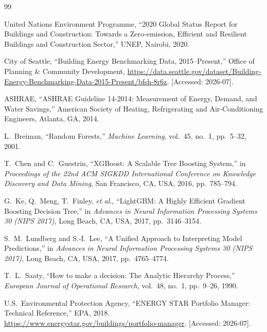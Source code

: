 \documentclass[12pt,a4paper]{ctexart}
\begin{document}
\begin{thebibliography}{99}

United Nations Environment Programme,
``2020 Global Status Report for Buildings and Construction: Towards a Zero-emission, Efficient and Resilient Buildings and Construction Sector,''
UNEP, Nairobi, 2020.

City of Seattle,
``Building Energy Benchmarking Data, 2015--Present,''
Office of Planning \& Community Development,
\url{https://data.seattle.gov/dataset/Building-Energy-Benchmarking-Data-2015-Present/bfsh-8r6z}.
[Accessed: 2026-07].

ASHRAE,
``ASHRAE Guideline 14-2014: Measurement of Energy, Demand, and Water Savings,''
American Society of Heating, Refrigerating and Air-Conditioning Engineers, Atlanta, GA, 2014.

L.~Breiman,
``Random Forests,''
\textit{Machine Learning}, vol.~45, no.~1, pp.~5--32, 2001.

T.~Chen and C.~Guestrin,
``XGBoost: A Scalable Tree Boosting System,''
in \textit{Proceedings of the 22nd ACM SIGKDD International Conference on Knowledge Discovery and Data Mining},
San Francisco, CA, USA, 2016, pp.~785--794.

G.~Ke, Q.~Meng, T.~Finley, \textit{et al.},
``LightGBM: A Highly Efficient Gradient Boosting Decision Tree,''
in \textit{Advances in Neural Information Processing Systems 30 (NIPS 2017)},
Long Beach, CA, USA, 2017, pp.~3146--3154.

S.~M.~Lundberg and S.-I.~Lee,
``A Unified Approach to Interpreting Model Predictions,''
in \textit{Advances in Neural Information Processing Systems 30 (NIPS 2017)},
Long Beach, CA, USA, 2017, pp.~4765--4774.

T.~L.~Saaty,
``How to make a decision: The Analytic Hierarchy Process,''
\textit{European Journal of Operational Research}, vol.~48, no.~1, pp.~9--26, 1990.

U.S.~Environmental Protection Agency,
``ENERGY STAR Portfolio Manager: Technical Reference,''
EPA, 2018.
\url{https://www.energystar.gov/buildings/portfolio-manager}. [Accessed: 2026-07].

\end{thebibliography}
\end{document}
